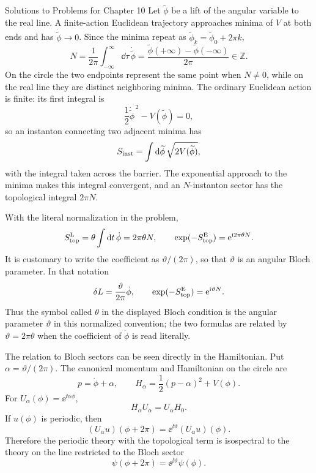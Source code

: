 \begin{bankssolutions}{Solutions to Problems for Chapter 10}
Let $\widetilde\phi$ be a lift of the angular variable to the real line.  A
finite-action Euclidean trajectory approaches minima of $V$ at both ends and
has $\dot{\widetilde\phi}\to0$.  Since the minima repeat as
$\widetilde\phi_k=\widetilde\phi_0+2\pi k$,
\[
 N=\frac{1}{2\pi}\int_{-\infty}^{\infty}\dd\tau\,
 \dot{\widetilde\phi}
 =\frac{\widetilde\phi(+\infty)-\widetilde\phi(-\infty)}{2\pi}
 \in\mathbb Z.
\]
On the circle the two endpoints represent the same point when $N\ne0$, while
on the real line they are distinct neighboring minima.  The ordinary
Euclidean action is finite: its first integral is
\[
 \frac12\dot{\widetilde\phi}^{\,2}-V(\widetilde\phi)=0,
\]
so an instanton connecting two adjacent minima has
\[
 S_{\rm inst}=\int\mathop{}\!\mathrm{d}\widetilde\phi\,\sqrt{2V(\widetilde\phi)},
\]
with the integral taken across the barrier.  The exponential approach to the
minima makes this integral convergent, and an $N$-instanton sector has the
topological integral $2\pi N$.

With the literal normalization in the problem,
\[
 S_{\rm top}^{\rm L}=\theta\int\mathop{}\!\mathrm{d} t\,\dot\phi=2\pi\theta N,
 \qquad
 \exp(-S_{\rm top}^{\rm E})=\mathrm{e}^{\mathrm{i} 2\pi\theta N}.
\]
It is customary to write the coefficient as $\vartheta/(2\pi)$, so that
$\vartheta$ is an angular Bloch parameter.  In that notation
\[
 \delta L=\frac{\vartheta}{2\pi}\dot\phi,
 \qquad
 \exp(-S_{\rm top}^{\rm E})=\mathrm{e}^{\mathrm{i}\vartheta N}.
\]
Thus the symbol called $\theta$ in the displayed Bloch condition is the
angular parameter $\vartheta$ in this normalized convention; the two formulas
are related by $\vartheta=2\pi\theta$ when the coefficient of $\dot\phi$ is
read literally.

The relation to Bloch sectors can be seen directly in the Hamiltonian.  Put
$\alpha=\vartheta/(2\pi)$.  The canonical momentum and Hamiltonian on the
circle are
\[
 p=\dot\phi+\alpha,
 \qquad
 H_\alpha=\frac12(p-\alpha)^2+V(\phi).
\]
For $U_\alpha(\phi)=\ee^{\ii\alpha\phi}$,
\[
 H_\alpha U_\alpha=U_\alpha H_0.
\]
If $u(\phi)$ is periodic, then
\[
 (U_\alpha u)(\phi+2\pi)=\ee^{\ii\vartheta}(U_\alpha u)(\phi).
\]
Therefore the periodic theory with the topological term is isospectral to
the theory on the line restricted to the Bloch sector
\[
 \psi(\phi+2\pi)=\ee^{\ii\vartheta}\psi(\phi).
\]


\end{bankssolutions}
